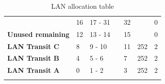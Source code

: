 \documentclass[11pt,a4paper]{report}
\begin{document}
\begin{center}
\begin{longtable}{lllllll}
                                                               & \cellcolor[HTML]{BFBFBF}16 & 17 - 31             &                 & 32                                     &                                          & 0                                    \\
                \multirow{-2}{*}{\textbf{Unused remaining}}    & \cellcolor[HTML]{C09FE5}12 & 13 - 14             &                 & 15                                     &                                          & 0                                    \\ \hline
                \cellcolor[HTML]{C09FE5}\textbf{LAN Transit C} & 8                          & 9 - 10              &                 & 11                                     & 252                                      & 2                                    \\
                \cellcolor[HTML]{C09FE5}\textbf{LAN Transit B} & 4                          & 5 - 6               &                 & 7                                      & 252                                      & 2                                    \\
                \cellcolor[HTML]{C09FE5}\textbf{LAN Transit A} & 0                          & 1 - 2               &                 & 3                                      & 252                                      & 2                                    \\ \hline
                \caption{LAN allocation table}
                \label{tab:lanalloctable}\\
            \end{longtable}
        \end{center}
\end{document}

